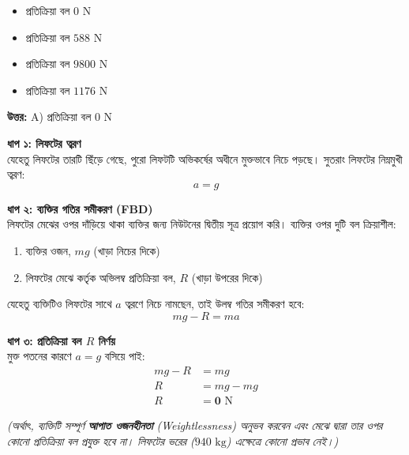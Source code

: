 \documentclass[12pt, a4paper]{article}
\begin{document}
\begin{itemize}[label={}, leftmargin=1cm, itemsep=0.5em]
    \item[\textbf{A)}] প্রতিক্রিয়া বল $0\text{ N}$
    \item[\textbf{B)}] প্রতিক্রিয়া বল $588\text{ N}$
    \item[\textbf{C)}] প্রতিক্রিয়া বল $9800\text{ N}$
    \item[\textbf{D)}] প্রতিক্রিয়া বল $1176\text{ N}$
\end{itemize}

\vspace{0.5em}
\begin{tcolorbox}[answerbox]
    \textbf{\color{success} উত্তর:} A) প্রতিক্রিয়া বল $0\text{ N}$
\end{tcolorbox}
\vspace{1em}

\begin{tcolorbox}[solutionbox={সমাধান (Solution)}]
    \noindent
    \textbf{ধাপ ১: লিফটের ত্বরণ} \\
    যেহেতু লিফটের তারটি ছিঁড়ে গেছে, পুরো লিফটটি অভিকর্ষের অধীনে মুক্তভাবে নিচে পড়ছে। সুতরাং লিফটের নিম্নমুখী ত্বরণ:
    \[ a = g \]
    
    \vspace{0.5em}
    \noindent\textbf{ধাপ ২: ব্যক্তির গতির সমীকরণ (FBD)} \\
    লিফটের মেঝের ওপর দাঁড়িয়ে থাকা ব্যক্তির জন্য নিউটনের দ্বিতীয় সূত্র প্রয়োগ করি। ব্যক্তির ওপর দুটি বল ক্রিয়াশীল:
    \begin{enumerate}[topsep=0pt, itemsep=0pt]
        \item ব্যক্তির ওজন, $mg$ (খাড়া নিচের দিকে)
        \item লিফটের মেঝে কর্তৃক অভিলম্ব প্রতিক্রিয়া বল, $R$ (খাড়া উপরের দিকে)
    \end{enumerate}
    যেহেতু ব্যক্তিটিও লিফটের সাথে $a$ ত্বরণে নিচে নামছেন, তাই উলম্ব গতির সমীকরণ হবে:
    \[ mg - R = ma \]
    
    \vspace{0.5em}
    \noindent\textbf{ধাপ ৩: প্রতিক্রিয়া বল $R$ নির্ণয়} \\
    মুক্ত পতনের কারণে $a = g$ বসিয়ে পাই:
    \begin{align*}
        mg - R &= mg \\
        R &= mg - mg \\
        R &= \mathbf{0}\text{ N}
    \end{align*}
    
    \textit{(অর্থাৎ, ব্যক্তিটি সম্পূর্ণ \textbf{আপাত ওজনহীনতা} (Weightlessness) অনুভব করবেন এবং মেঝে দ্বারা তার ওপর কোনো প্রতিক্রিয়া বল প্রযুক্ত হবে না। লিফটের ভরের ($940\text{ kg}$) এক্ষেত্রে কোনো প্রভাব নেই।)}
\end{tcolorbox}
\end{document}
